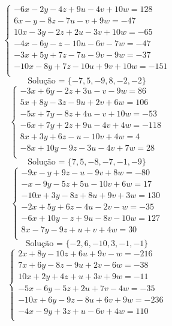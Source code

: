 \documentclass[12pt,oneside,a4paper]{article}
\begin{document}
\vspace{\baselineskip}
\begin{equation*}
\begin{cases}
-6x-2y-4z+9u-4v+10w=128 \\
6x-y-8z-7u-v+9w=-47 \\
10x-3y-2z+2u-3v+10w=-65 \\
-4x-6y-z-10u-6v-7w=-47 \\
-3x+5y+7z-7u-9v-9w=-37 \\
-10x-8y+7z-10u+9v+10w=-151 \\
\end{cases}
\end{equation*}
\begin{equation*}
\text{Solução = }\{-7,5,-9,8,-2,-2\}
\end{equation*}
\vspace{\baselineskip}
\begin{equation*}
\begin{cases}
-3x+6y-2z+3u-v-9w=86 \\
5x+8y-3z-9u+2v+6w=106 \\
-5x+7y-8z+4u-v+10w=-53 \\
-6x+7y+2z+9u-4v+4w=-118 \\
8x+3y+6z-u-10v+4w=4 \\
-8x+10y-9z-3u-4v+7w=28 \\
\end{cases}
\end{equation*}
\begin{equation*}
\text{Solução = }\{7,5,-8,-7,-1,-9\}
\end{equation*}
\vspace{\baselineskip}
\begin{equation*}
\begin{cases}
-9x-y+9z-u-9v+8w=-80 \\
-x-9y-5z+5u-10v+6w=17 \\
-10x+3y-8z+8u+9v+3w=130 \\
-2x+5y+6z-4u-2v-w=-35 \\
-6x+10y-z+9u-8v-10w=127 \\
8x-7y-9z+u+v+4w=30 \\
\end{cases}
\end{equation*}
\begin{equation*}
\text{Solução = }\{-2,6,-10,3,-1,-1\}
\end{equation*}
\vspace{\baselineskip}
\begin{equation*}
\begin{cases}
2x+8y-10z+6u+9v-w=-216 \\
7x+6y-8z-9u+2v-6w=-38 \\
10x+2y+4z+u+3v+9w=-11 \\
-5x-6y-5z+2u+7v-4w=-35 \\
-10x+6y-9z-8u+6v+9w=-236 \\
-4x-9y+3z+u-6v+4w=110 \\
\end{cases}
\end{equation*}
\end{document}

